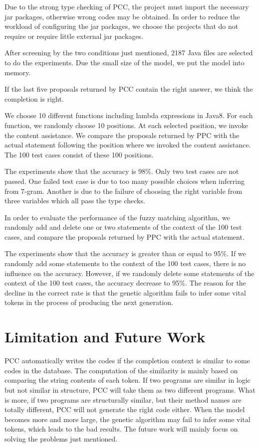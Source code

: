 \documentclass{sig-alternate-05-2015}
\begin{document}
Due to the strong type checking of PCC, the project must import the necessary jar packages, otherwise wrong codes may be obtained. In order to reduce the workload of configuring the jar packages, we choose the projects that do not require or require little external jar packages.

After screening by the two conditions just mentioned, 2187 Java files are selected to do the experiments. Due the small size of the model, we put the model into memory.

If the last five proposals returned by PCC contain the right answer, we think the completion is right.

We choose 10 different functions including lambda expressions in Java8. For each function, we randomly choose 10 positions. At each selected position, we invoke the content assistance. We compare the proposals returned by PPC with the actual statement following the position where we invoked the content assistance. The 100 test cases consist of these 100 positions.

The experiments show that the accuracy is 98\%. Only two test cases are not passed. One failed test case is due to too many possible choices when inferring from 7-gram. Another is due to the failure of choosing the right variable from three variables which all pass the type checks.

In order to evaluate the performance of the fuzzy matching algorithm, we randomly add and delete one or two statements of the context of the 100 test cases, and compare the proposals returned by PPC with the actual statement.

The experiments show that the accuracy is greater than or equal to 95\%. If we randomly add some statements to the context of the 100 test cases, there is no influence on the accuracy. However, if we randomly delete some statements of the context of the 100 test cases, the accuracy decrease to 95\%. The reason for the decline in the correct rate is that the genetic algorithm fails to infer some vital tokens in the process of producing the next generation.

\section{Limitation and Future Work}

PCC automatically writes the codes if the completion context is similar to some codes in the database. The computation of the similarity is mainly based on comparing the string contents of each token. If two programs are similar in logic but not similar in structure, PCC will take them as two different programs. What is more, if two programs are structurally similar, but their method names are totally different, PCC will not generate the right code either. When the model becomes more and more large, the genetic algorithm may fail to infer some vital tokens, which leads to the bad results. The future work will mainly focus on solving the problems just mentioned.
\end{document}
